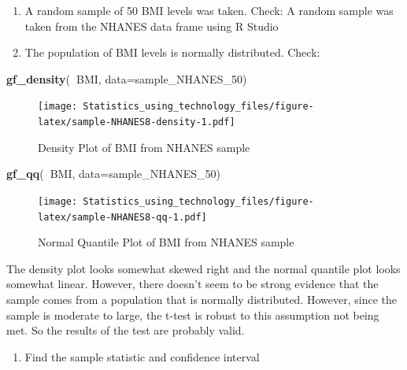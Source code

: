 \documentclass[
]{book}
\newenvironment{Shaded}{\begin{snugshade}}{\end{snugshade}}
\newcommand{\DataTypeTok}[1]{\textcolor[rgb]{0.13,0.29,0.53}{#1}}
\newcommand{\DecValTok}[1]{\textcolor[rgb]{0.00,0.00,0.81}{#1}}
\newcommand{\KeywordTok}[1]{\textcolor[rgb]{0.13,0.29,0.53}{\textbf{#1}}}
\newcommand{\NormalTok}[1]{#1}
\newcommand{\OperatorTok}[1]{\textcolor[rgb]{0.81,0.36,0.00}{\textbf{#1}}}
\providecommand{\tightlist}{%
  \setlength{\itemsep}{0pt}\setlength{\parskip}{0pt}}
\begin{document}
\begin{enumerate}
\def\labelenumi{\alph{enumi}.}
\item
  A random sample of 50 BMI levels was taken. Check: A random sample was taken from the NHANES data frame using R Studio
\item
  The population of BMI levels is normally distributed. Check:
\end{enumerate}



\begin{Shaded}
\begin{Highlighting}[]
\KeywordTok{gf_density}\NormalTok{(}\OperatorTok{~}\NormalTok{BMI, }\DataTypeTok{data=}\NormalTok{sample_NHANES_}\DecValTok{50}\NormalTok{)}
\end{Highlighting}
\end{Shaded}

\begin{figure}
\centering
\texttt{[image: Statistics\_using\_technology\_files/figure-latex/sample-NHANES8-density-1.pdf]}
\caption{\label{fig:sample-NHANES8-density}Density Plot of BMI from NHANES sample}
\end{figure}



\begin{Shaded}
\begin{Highlighting}[]
\KeywordTok{gf_qq}\NormalTok{(}\OperatorTok{~}\NormalTok{BMI, }\DataTypeTok{data=}\NormalTok{sample_NHANES_}\DecValTok{50}\NormalTok{)}
\end{Highlighting}
\end{Shaded}

\begin{figure}
\centering
\texttt{[image: Statistics\_using\_technology\_files/figure-latex/sample-NHANES8-qq-1.pdf]}
\caption{\label{fig:sample-NHANES8-qq}Normal Quantile Plot of BMI from NHANES sample}
\end{figure}

The density plot looks somewhat skewed right and the normal quantile plot looks somewhat linear. However, there doesn't seem to be strong evidence that the sample comes from a population that is normally distributed. However, since the sample is moderate to large, the t-test is robust to this assumption not being met. So the results of the test are probably valid.

\begin{enumerate}
\def\labelenumi{\arabic{enumi}.}
\setcounter{enumi}{3}
\tightlist
\item
  Find the sample statistic and confidence interval
\end{enumerate}
\end{document}
